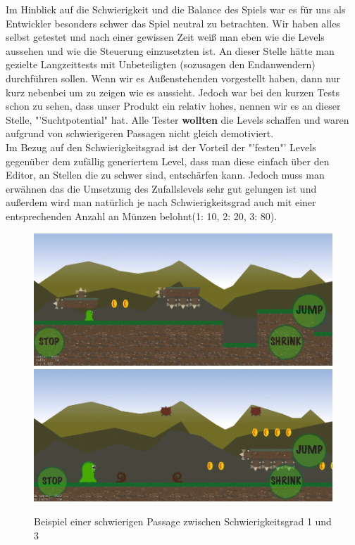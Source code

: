 Im Hinblick auf die Schwierigkeit und die Balance des Spiels war es für uns als Entwickler besonders schwer das Spiel neutral zu betrachten. Wir haben alles selbst getestet und nach einer gewissen Zeit weiß man eben wie die Levels aussehen und wie die Steuerung einzusetzten ist. An dieser Stelle hätte man gezielte Langzeittests mit Unbeteiligten (sozusagen den Endanwendern) durchführen sollen. Wenn wir es Außenstehenden vorgestellt haben, dann nur kurz nebenbei um zu zeigen wie es aussieht.
Jedoch war bei den kurzen Tests schon zu sehen, dass unser Produkt ein relativ hohes, nennen wir es an dieser Stelle, "'Suchtpotential" hat. Alle Tester \textbf{wollten} die Levels schaffen und waren aufgrund von schwierigeren Passagen nicht gleich demotiviert.
\\Im Bezug auf den Schwierigkeitsgrad ist der Vorteil der "'festen"' Levels gegenüber dem zufällig generiertem Level, dass man diese einfach über den Editor, an Stellen die zu schwer sind, entschärfen kann. Jedoch muss man erwähnen das die Umsetzung des Zufallslevels sehr gut gelungen ist und außerdem wird man natürlich je nach Schwierigkeitsgrad auch mit einer entsprechenden Anzahl an Münzen belohnt(1: 10, 2: 20, 3: 80).

\begin{figure}[H]
\centering
\includegraphics[width=14cm]{resources/randomdiff1}
\\[0.5em]
\includegraphics[width=14cm]{resources/randomdiff3}
\caption{Beispiel einer schwierigen Passage zwischen Schwierigkeitsgrad 1 und 3}
\label{fig: randomdiff}
\end{figure}

